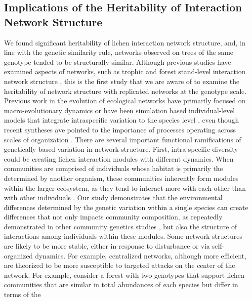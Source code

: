 \documentclass[fleqn,12pt]{olplainarticle}
\begin{document}
\subsection*{Implications of the Heritability of Interaction Network Structure}


We found significant heritability of lichen interaction network
structure, and, in line with the genetic similarity rule, networks
observed on trees of the same genotype tended to be structurally
similar. Although previous studies have examined aspects of networks,
such as trophic \cite{Barbour2019TraitCommunities} and forest
stand-level interaction network structure
\cite{Lau2016GenotypicEvolution, Keith2017}, this is the first study
that we are aware of to examine the heritability of network structure
with replicated networks at the genotype scale. Previous work in the
evolution of ecological networks have primarily focused on
macro-evolutionary dynamics \cite{Rezende2007,
  Weber2017EvolutionMacroevolution, Valverde2018TheSpandrel,
  Harmon2019DetectingInteractions} or have been simulation based
individual-level models that integrate intraspecific variation to the
species level \cite{Maliet2020AnNetworks}, even though recent
syntheses ave pointed to the importance of processes operating across
scales of organization \cite{Guimaraes2020TheOrganization}. There are
several important functional ramifications of genetically based
variation in network structure. First, intra-specific diversity could
be creating lichen interaction modules with different dynamics. When
communities are comprised of individuals whose habitat is primarily
the determined by another organism, these communities inherently form
modules within the larger ecosystem, as they tend to interact more
with each other than with other individuals \cite{Lau2017a}. Our study
demonstrates that the environmental differences determined by the
genetic variation within a single species can create differences that
not only impacts community composition, as repeatedly demonstrated in
other community genetics studies \cite{Whitham2006a,
  DesRoches2018TheVariation}, but also the structure of interactions
among individuals within these modules.  Some network structures are
likely to be more stable, either in response to disturbance or via
self-organized dynamics. For example, centralized networks, although
more efficient, are theorized to be more susceptible to targeted
attacks on the center of the network. For example, consider a forest
with two genotypes that support lichen communities that are similar in
total abundances of each species but differ in terms of the
\end{document}
